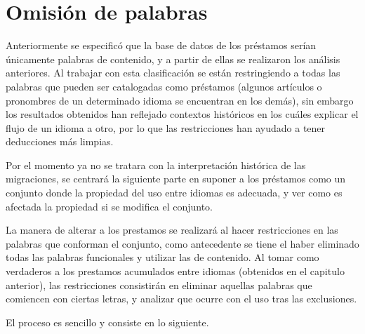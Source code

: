 \chapter{Omisión de palabras}

Anteriormente se especificó que la base de datos de los préstamos serían únicamente palabras de contenido, y a partir de ellas se realizaron los análisis anteriores.  Al trabajar con esta clasificación se están restringiendo a todas las palabras que pueden ser catalogadas como préstamos (algunos artículos o pronombres de un determinado idioma se encuentran en los demás), sin embargo los resultados obtenidos han reflejado contextos históricos en los cuáles explicar el flujo de un idioma a otro, por lo que las restricciones han ayudado a tener deducciones más limpias. 

Por el momento ya no se tratara con la interpretación histórica de las migraciones, se centrará la siguiente parte en suponer a los préstamos como un conjunto donde la propiedad del uso entre idiomas es adecuada, y ver como es afectada la propiedad si se modifica el conjunto. 

La manera de alterar a los prestamos se realizará al hacer restricciones en las palabras que conforman el conjunto, como antecedente se tiene el haber eliminado todas las palabras funcionales  y utilizar las de contenido.  Al tomar como verdaderos a los prestamos acumulados entre idiomas (obtenidos en el capitulo anterior), las restricciones consistirán en eliminar aquellas palabras que comiencen con ciertas letras,  y analizar que ocurre con el uso tras las exclusiones. 

\hfill\break

El proceso es sencillo y consiste en lo siguiente.
 


